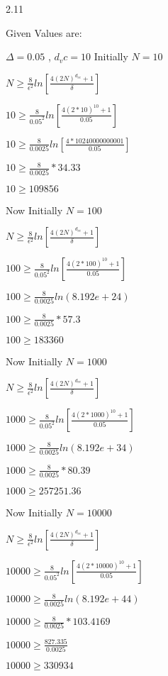 \documentclass[12pt]{article}
\begin{document}
2.11

Given Values are:

$\Delta=0.05$ , $d_vc=10$ Initially $N=10$

$N\geq \frac{8}{\epsilon^2}ln[\frac{4(2N)^{d_{vc}}+1}{\delta}]$

$10\geq \frac{8}{0.05^2}ln[\frac{4(2*10)^{10}+1}{0.05}]$

$10\geq \frac{8}{0.0025}ln[\frac{4*10240000000001}{0.05}]$

$10\geq \frac{8}{0.0025}*34.33$

$10\geq109856$


Now Initially $N=100$

$N\geq \frac{8}{\epsilon^2}ln[\frac{4(2N)^{d_{vc}}+1}{\delta}]$

$100\geq \frac{8}{0.05^2}ln[\frac{4(2*100)^{10}+1}{0.05}]$

$100\geq \frac{8}{0.0025}ln(8.192e+24)$

$100\geq \frac{8}{0.0025}*57.3$

$100\geq 183360$


Now Initially $N=1000$

$N\geq \frac{8}{\epsilon^2}ln[\frac{4(2N)^{d_{vc}}+1}{\delta}]$

$1000\geq \frac{8}{0.05^2}ln[\frac{4(2*1000)^{10}+1}{0.05}]$ 

$1000\geq \frac{8}{0.0025}ln(8.192e+34)$

$1000\geq \frac{8}{0.0025}*80.39$


$1000\geq 257251.36$



Now Initially $N=10000$

$N\geq \frac{8}{\epsilon^2}ln[\frac{4(2N)^{d_{vc}}+1}{\delta}]$

$10000\geq \frac{8}{0.05^2}ln[\frac{4(2*10000)^{10}+1}{0.05}]$

$10000\geq \frac{8}{0.0025}ln(8.192e+44)$

$10000\geq \frac{8}{0.0025}*103.4169$

$10000\geq \frac{827.335}{0.0025}$

$10000\geq 330934$


 
\end{document}
